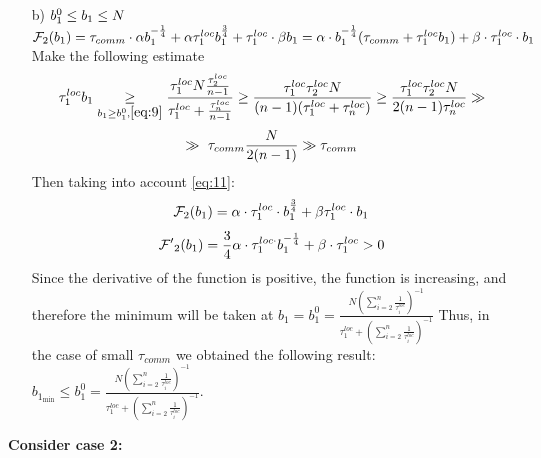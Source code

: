 \documentclass{article}
\begin{document}
\begin{itemize}
    \item[b)] $b_1^0\leq b_1\leq N\\$
    $\mathcal{F}_2(b_1) = \tau_{comm}\cdot 
    \alpha  b_1^{-\frac{1}{4}} + 
    \alpha\tau_1^{loc} b_1^{\frac{3}{4}}  + \tau_1^{loc}\cdot \beta b_1 =  \alpha\cdot b_1^{-\frac{1}{4}}(\tau_{comm} + \tau_1^{loc}b_1) + \beta\cdot\tau_1^{loc}\cdot b_1\\$
    Make the following estimate
    \begin{equation}
    \label{eq:11}
      \tau_1^{loc}b_1\underset{b_1\geq b_1^0, \eqref{eq:9}}{\geq} \frac{\tau_1^{loc}N\frac{\tau_2^{loc}}{n - 1}}{\tau_1^{loc} + \frac{\tau_n^{loc}}{n - 1}}\geq \frac{\tau_1^{loc}\tau_2^{loc}N}{(n - 1)(\tau_1^{loc} + \tau_n^{loc})}\geq \frac{\tau_1^{loc}\tau_2^{loc}N}{2(n - 1)\tau_n^{loc}} \gg
    \end{equation}
    \begin{equation}
         \notag
         \gg ~
       \tau_{comm}\frac{N}{2(n - 1)} \gg \tau_{comm}
    \end{equation}
    Then taking into account \eqref{eq:11}:
    \begin{equation}
        \notag
        \mathcal F_2(b_1) = \alpha\cdot\tau_1^{loc}\cdot b_1^{\frac{3}{4}} + \beta \tau_1^{loc}\cdot b_1
    \end{equation}
    \begin{equation}
        \notag
        \mathcal{F'}_2(b_1) = \frac{3}{4}\alpha\cdot\tau_1^{loc\cdot} b_1^{-\frac{1}{4}} + \beta\cdot\tau_1^{loc} > 0
    \end{equation}
    Since the derivative of the function is positive, the function is increasing, and therefore the minimum will be taken at $b_1 = b_1^{0} = \frac{N (\sum\limits_{i = 2}^{n} \frac{1}{\tau_i^{loc}})^{-1}}{\tau_1^{loc} + (\sum\limits_{i = 2}^{n} \frac{1}{\tau_i^{loc}})^{-1}}$  
Thus, in the case of small $\tau_{comm}$ we obtained the following result:\\
$b_{1_{\min}} \leq b_1^0 = \frac{N (\sum\limits_{i = 2}^{n} \frac{1}{\tau_i^{loc}})^{-1}}{\tau_1^{loc} + (\sum\limits_{i = 2}^{n} \frac{1}{\tau_i^{loc}})^{-1}}$.
\end{itemize}
\textbf{Consider case 2:}
\end{document}
